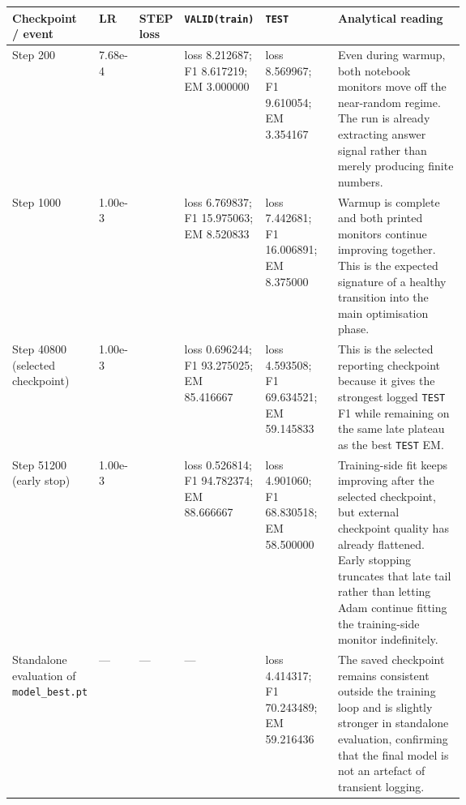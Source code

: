 \documentclass[10pt]{article}
\begin{document}
\small
\begin{center}
\begin{tabularx}{\linewidth}{>{\raggedright\arraybackslash}p{0.16\linewidth}>{\centering\arraybackslash}p{0.08\linewidth}>{\centering\arraybackslash}p{0.09\linewidth}>{\raggedright\arraybackslash}p{0.16\linewidth}>{\raggedright\arraybackslash}p{0.16\linewidth}>{\raggedright\arraybackslash}X}
\toprule
\textbf{Checkpoint / event} & \textbf{LR} & \textbf{STEP loss} & \textbf{\texttt{VALID(train)}} & \textbf{\texttt{TEST}} & \textbf{Analytical reading} \\
\midrule
Step 200 & 7.68e-4 & 29.701719 & loss 8.212687; F1 8.617219; EM 3.000000 & loss 8.569967; F1 9.610054; EM 3.354167 & Even during warmup, both notebook monitors move off the near-random regime. The run is already extracting answer signal rather than merely producing finite numbers. \\
Step 1000 & 1.00e-3 & 7.278081 & loss 6.769837; F1 15.975063; EM 8.520833 & loss 7.442681; F1 16.006891; EM 8.375000 & Warmup is complete and both printed monitors continue improving together. This is the expected signature of a healthy transition into the main optimisation phase. \\
Step 40800 (selected checkpoint) & 1.00e-3 & 1.544758 & loss 0.696244; F1 93.275025; EM 85.416667 & loss 4.593508; F1 69.634521; EM 59.145833 & This is the selected reporting checkpoint because it gives the strongest logged \texttt{TEST} F1 while remaining on the same late plateau as the best \texttt{TEST} EM. \\
Step 51200 (early stop) & 1.00e-3 & 1.408177 & loss 0.526814; F1 94.782374; EM 88.666667 & loss 4.901060; F1 68.830518; EM 58.500000 & Training-side fit keeps improving after the selected checkpoint, but external checkpoint quality has already flattened. Early stopping truncates that late tail rather than letting Adam continue fitting the training-side monitor indefinitely. \\
Standalone evaluation of \texttt{model\_best.pt} & --- & --- & --- & loss 4.414317; F1 70.243489; EM 59.216436 & The saved checkpoint remains consistent outside the training loop and is slightly stronger in standalone evaluation, confirming that the final model is not an artefact of transient logging. \\
\bottomrule
\end{tabularx}
\end{center}
\normalsize
\end{document}
